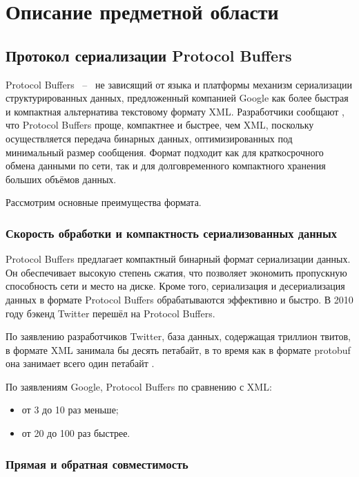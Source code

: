 \section{Описание предметной области}

\subsection{Протокол сериализации Protocol Buffers}

Protocol Buffers ~--~ не зависящий от языка и платформы механизм сериализации структурированных данных, предложенный компанией Google 
как более быстрая и компактная альтернатива текстовому формату XML. Разработчики сообщают \cite{protobuf_doc}, что Protocol Buffers проще, 
компактнее и быстрее, чем XML, поскольку осуществляется передача бинарных данных, оптимизированных под минимальный размер сообщения. 
Формат подходит как для краткосрочного обмена данными по сети, так и для долговременного компактного хранения больших объёмов данных.

Рассмотрим основные преимущества формата.

\subsubsection{Скорость обработки и компактность сериализованных данных}

Protocol Buffers предлагает компактный бинарный формат сериализации данных.
Он обеспечивает высокую степень сжатия, что позволяет экономить пропускную способность сети и место на диске\cite{protobuf_book}. 
Кроме того, сериализация и десериализация данных в формате Protocol Buffers обрабатываются эффективно и быстро.
В 2010 году бэкенд Twitter перешёл на Protocol Buffers.

По заявлению разработчиков Twitter, база данных, содержащая триллион твитов, в формате XML занимала бы десять петабайт, в то время как в формате protobuf она занимает всего один петабайт \cite{protobuf_twitter}.

По заявлениям Google, Protocol Buffers по сравнению с XML:
\begin{itemize}
    \item от 3 до 10 раз меньше;
    \item от 20 до 100 раз быстрее.
\end{itemize}

\subsubsection{Прямая и обратная совместимость}

